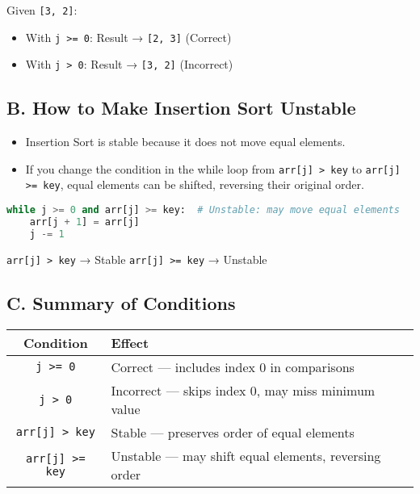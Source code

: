 \documentclass[14pt]{extarticle}
\begin{document}
\begin{tcolorbox}[colback=white, colframe=black, title=Example]
Given \texttt{[3, 2]}:

\begin{itemize}
    \item With \texttt{j >= 0}: Result → \texttt{[2, 3]} (Correct)
    \item With \texttt{j > 0}: Result → \texttt{[3, 2]} (Incorrect)
\end{itemize}
\end{tcolorbox}

\vspace{1em}

\subsection*{B. How to Make Insertion Sort Unstable}

\begin{itemize}
    \item Insertion Sort is stable because it does not move equal elements.
    \item If you change the condition in the while loop from \texttt{arr[j] > key} to \texttt{arr[j] >= key}, equal elements can be shifted, reversing their original order.
\end{itemize}

\begin{lstlisting}[language=Python, caption=Unstable Version]
while j >= 0 and arr[j] >= key:  # Unstable: may move equal elements
    arr[j + 1] = arr[j]
    j -= 1
\end{lstlisting}

\begin{tcolorbox}[colback=white, colframe=black, title=Stability Impact]
\texttt{arr[j] > key} → Stable  
\newline
\texttt{arr[j] >= key} → Unstable
\end{tcolorbox}

\vspace{1em}

\subsection*{C. Summary of Conditions}

\begin{center}
\begin{tabular}{|c|p{8cm}|}
\hline
\textbf{Condition} & \textbf{Effect} \\
\hline
\texttt{j >= 0} & Correct — includes index 0 in \newline comparisons \\
\texttt{j > 0} & Incorrect — skips index 0, may miss minimum value \\
\texttt{arr[j] > key} & Stable — preserves order of equal \newline elements \\
\texttt{arr[j] >= key} & Unstable — may shift equal elements, reversing order \\
\hline
\end{tabular}
\end{center}
\end{document}

